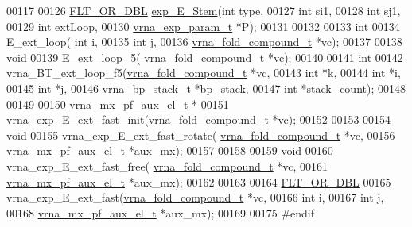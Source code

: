 \begin{DoxyCode}
00117 
00126 \hyperlink{group__data__structures_ga31125aeace516926bf7f251f759b6126}{FLT\_OR\_DBL} \hyperlink{exterior__loops_8h_ab0aa9833ab41875a91a9be8a5ffd7092}{exp\_E\_Stem}(\textcolor{keywordtype}{int} type,
00127                   \textcolor{keywordtype}{int} si1,
00128                   \textcolor{keywordtype}{int} sj1,
00129                   \textcolor{keywordtype}{int} extLoop,
00130                   \hyperlink{group__energy__parameters_structvrna__exp__param__s}{vrna\_exp\_param\_t} *P);
00131 
00132 
00133 \textcolor{keywordtype}{int}
00134 E\_ext\_loop( \textcolor{keywordtype}{int} i,
00135             \textcolor{keywordtype}{int} j,
00136             \hyperlink{group__fold__compound_structvrna__fc__s}{vrna\_fold\_compound\_t} *vc);
00137 
00138 \textcolor{keywordtype}{void}
00139 E\_ext\_loop\_5( \hyperlink{group__fold__compound_structvrna__fc__s}{vrna\_fold\_compound\_t} *vc);
00140 
00141 \textcolor{keywordtype}{int}
00142 vrna\_BT\_ext\_loop\_f5(\hyperlink{group__fold__compound_structvrna__fc__s}{vrna\_fold\_compound\_t} *vc,
00143                     \textcolor{keywordtype}{int} *k,
00144                     \textcolor{keywordtype}{int} *i,
00145                     \textcolor{keywordtype}{int} *j,
00146                     \hyperlink{group__data__structures_structvrna__bp__stack__s}{vrna\_bp\_stack\_t} *bp\_stack,
00147                     \textcolor{keywordtype}{int} *stack\_count);
00148 
00149 
00150 \hyperlink{group__loops_structvrna__mx__pf__aux__el__t}{vrna\_mx\_pf\_aux\_el\_t} *
00151 vrna\_exp\_E\_ext\_fast\_init(\hyperlink{group__fold__compound_structvrna__fc__s}{vrna\_fold\_compound\_t} *vc);
00152 
00153 
00154 \textcolor{keywordtype}{void}
00155 vrna\_exp\_E\_ext\_fast\_rotate( \hyperlink{group__fold__compound_structvrna__fc__s}{vrna\_fold\_compound\_t}  *vc,
00156                             \hyperlink{group__loops_structvrna__mx__pf__aux__el__t}{vrna\_mx\_pf\_aux\_el\_t}   *aux\_mx);
00157 
00158 
00159 \textcolor{keywordtype}{void}
00160 vrna\_exp\_E\_ext\_fast\_free( \hyperlink{group__fold__compound_structvrna__fc__s}{vrna\_fold\_compound\_t}  *vc,
00161                           \hyperlink{group__loops_structvrna__mx__pf__aux__el__t}{vrna\_mx\_pf\_aux\_el\_t}   *aux\_mx);
00162 
00163 
00164 \hyperlink{group__data__structures_ga31125aeace516926bf7f251f759b6126}{FLT\_OR\_DBL}
00165 vrna\_exp\_E\_ext\_fast(\hyperlink{group__fold__compound_structvrna__fc__s}{vrna\_fold\_compound\_t}  *vc,
00166                     \textcolor{keywordtype}{int}                   i,
00167                     \textcolor{keywordtype}{int}                   j,
00168                     \hyperlink{group__loops_structvrna__mx__pf__aux__el__t}{vrna\_mx\_pf\_aux\_el\_t}   *aux\_mx);
00169 
00175 \textcolor{preprocessor}{#endif}
\end{DoxyCode}
